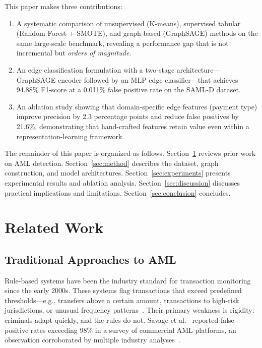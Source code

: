 \documentclass[conference]{IEEEtran}
\begin{document}
This paper makes three contributions:
\begin{enumerate}
    \item A systematic comparison of unsupervised (K-means), supervised tabular (Random Forest + SMOTE), and graph-based (GraphSAGE) methods on the same large-scale benchmark, revealing a performance gap that is not incremental but \textit{orders of magnitude}.
    \item An edge classification formulation with a two-stage architecture—GraphSAGE encoder followed by an MLP edge classifier—that achieves 94.88\% F1-score at a 0.011\% false positive rate on the SAML-D dataset.
    \item An ablation study showing that domain-specific edge features (payment type) improve precision by 2.3 percentage points and reduce false positives by 21.6\%, demonstrating that hand-crafted features retain value even within a representation-learning framework.
\end{enumerate}

The remainder of this paper is organized as follows. Section~\ref{sec:related} reviews prior work on AML detection. Section~\ref{sec:method} describes the dataset, graph construction, and model architectures. Section~\ref{sec:experiments} presents experimental results and ablation analysis. Section~\ref{sec:discussion} discusses practical implications and limitations. Section~\ref{sec:conclusion} concludes.


\section{Related Work}\label{sec:related}

\subsection{Traditional Approaches to AML}

Rule-based systems have been the industry standard for transaction monitoring since the early 2000s. These systems flag transactions that exceed predefined thresholds—e.g., transfers above a certain amount, transactions to high-risk jurisdictions, or unusual frequency patterns~\cite{fatf2012}. Their primary weakness is rigidity: criminals adapt quickly, and the rules do not. Savage et al.~\cite{savage2016detection} reported false positive rates exceeding 98\% in a survey of commercial AML platforms, an observation corroborated by multiple industry analyses~\cite{deloitte2020aml}.
\end{document}
